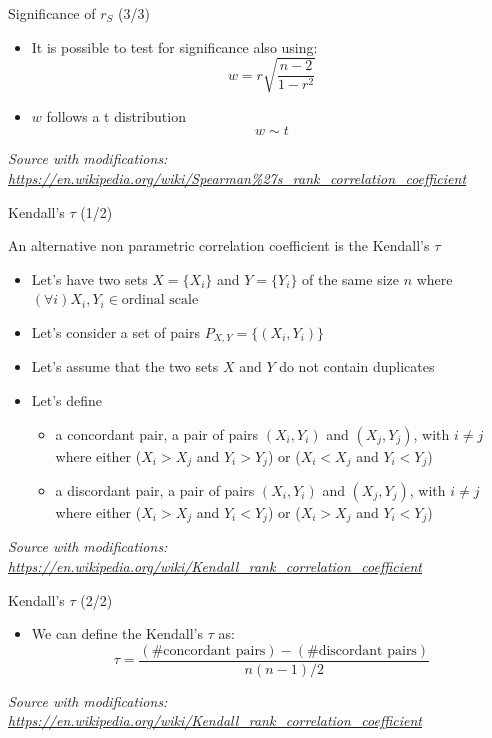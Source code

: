 \documentclass{beamer}
\begin{document}
\begin{frame}
{\centerline{Significance of $r_S$ (3/3)}}

\begin{itemize}
    \item It is possible to test for significance also using:
        $$w=r{\sqrt {\frac {n-2}{1-r^{2}}}}$$
    \item $w$ follows a t distribution
        $$w \sim t$$
\end{itemize}

\textit{\tiny
\vspace{-\baselineskip}
Source with modifications: \url{https://en.wikipedia.org/wiki/Spearman\%27s_rank_correlation_coefficient}}
\end{frame}


\begin{frame}
{\centerline{Kendall's $\tau$ (1/2)}}
An alternative non parametric correlation coefficient is the Kendall's $\tau$
\begin{itemize}
   \item Let's have two sets $X = \{X_i\}$ and $Y= \{Y_i\}$ of the same size $n$ where $(\forall i) X_i,Y_i \in \text{ordinal scale}$
   \item Let's consider a set of pairs $P_{X,Y} = \{(X_i,Y_i)\}$ 
   \item Let's assume that the two sets $X$ and $Y$ do not contain duplicates
   \item Let's define
   \begin{itemize}
    \item a concordant pair, a pair of pairs $(X_i,Y_i)$ and $(X_j,Y_j)$, with $i\neq j$ where either ($X_i > X_j$ and $Y_i > Y_j$) or ($X_i < X_j$ and $Y_i < Y_j$)
    \item a discordant pair, a pair of pairs $(X_i,Y_i)$ and $(X_j,Y_j)$, with $i\neq j$ where either ($X_i > X_j$ and $Y_i < Y_j$) or ($X_i > X_j$ and $Y_i < Y_j$)
\end{itemize}

\end{itemize}

\textit{\tiny
\vspace{-\baselineskip}
Source with modifications: \url{https://en.wikipedia.org/wiki/Kendall_rank_correlation_coefficient}}
\end{frame}

\begin{frame}
{\centerline{Kendall's $\tau$ (2/2)}}
\begin{itemize}
\item We can define the Kendall's $\tau$ as:
$$\tau ={\frac {({\text{\# concordant pairs}})-({\text{\# discordant pairs}})}{n(n-1)/2}}$$

\end{itemize}

\textit{\tiny
\vspace{-\baselineskip}
Source with modifications: \url{https://en.wikipedia.org/wiki/Kendall_rank_correlation_coefficient}}
\end{frame}
\end{document}
